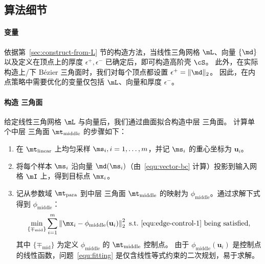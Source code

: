 \subsection{算法细节}

\paragraph{变量}
依据第~\ref{sec:construct-from-L} 节的构造方法，当线性三角网格 $\mL$、向量 $\{\md\}$ 以及定义在顶点上的厚度 $\epsilon^{+}, \epsilon^{-}$ 已确定后，即可构造高阶壳 $\cS$。
%
此外，在实际构造上/下 B\'{e}zier 三角面时，我们对每个顶点都设置 $\epsilon^{+} = \|\md\|_2$。
%
因此，在内点策略中需要优化的变量仅包括 $\mL$、向量和厚度 $\epsilon^{-}$。

\paragraph{构造 \Bezier 三角面}
给定线性三角网格 $\mL$ 与向量后，我们通过曲面拟合构造中层 \Bezier 三角面。
计算单个中层 \Bezier 三角面 $\mt_\text{middle}$ 的步骤如下：
\begin{enumerate}
  \item 在 \(\mt_{\text{linear}}\) 上均匀采样 \( \ms_i, i = 1, \ldots, m \)，并记 $\ms_i$ 的重心坐标为 $\mathbf{u}_i$。
  \item 将每个样本 $\ms_i$ 沿向量 $\md(\ms_i)$（由~\eqref{equ:vector-bc} 计算）投影到输入网格 \(\mI\) 上，得到目标点 \( \mx_i\)。
  \item 记从参数域 $\mt_\text{para}$ 到中层 \Bezier 三角面 $\mt_\text{middle}$ 的映射为 $\phi_\text{middle}$。通过求解下式得到 $\phi_\text{middle}$：
      \begin{equation}\label{equ:fitting}
		\min_{\{\mp_{\text{mid}}\}} \sum_{i=1}^{m} \left\| \mx_i - \phi_\text{middle}(\mathbf{u}_i) \right\|_2^2 \,\, \text{s.t.} \,\, \eqref{equ:edge-control-1} \text{ being satisfied},
	\end{equation}
其中 \( \{\mp_{\text{mid}}\}\) 为定义 $\phi_\text{middle}$ 的 $\mt_\text{middle}$ 控制点。
由于 $\phi_\text{middle}(\mathbf{u}_i)$ 是控制点的线性函数，问题~\eqref{equ:fitting} 是仅含线性等式约束的二次规划，易于求解。
\end{enumerate}
